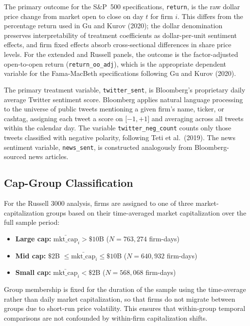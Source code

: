 The primary outcome for the S\&P~500 specifications, \texttt{return}, is
the raw dollar price change from market open to close on day \(t\) for
firm \(i\). This differs from the percentage return used in Gu and Kurov (2020); the dollar
denomination preserves interpretability of treatment coefficients as
dollar-per-unit sentiment effects, and firm fixed effects absorb
cross-sectional differences in share price levels. For the extended and
Russell panels, the outcome is the factor-adjusted open-to-open return
(\texttt{return\_oo\_adj}), which is the appropriate dependent variable
for the Fama-MacBeth specifications following Gu and Kurov (2020).

The primary treatment variable, \texttt{twitter\_sent}, is Bloomberg's
proprietary daily average Twitter sentiment score. Bloomberg applies
natural language processing to the universe of public tweets mentioning
a given firm's name, ticker, or cashtag, assigning each tweet a score on
\(\lbrack - 1, + 1\rbrack\) and averaging across all tweets within the
calendar day. The variable \texttt{twitter\_neg\_count} counts only
those tweets classified with negative polarity, following Teti et al.\ (2019). The news
sentiment variable, \texttt{news\_sent}, is constructed analogously from
Bloomberg-sourced news articles.

\subsection{Cap-Group Classification}\label{cap-group-classification}

For the Russell 3000 analysis, firms are assigned to one of three
market-capitalization groups based on their time-averaged market
capitalization over the full sample period:

\begin{itemize}
\item
  \textbf{Large cap:} \({\bar{\text{mkt\_cap}}}_{i} > \$ 10\)B
  (\(N = 763,274\) firm-days)
\item
  \textbf{Mid cap:} \(\$ 2\)B
  \(\leq {\bar{\text{mkt\_cap}}}_{i} \leq \$ 10\)B (\(N = 640,932\)
  firm-days)
\item
  \textbf{Small cap:} \({\bar{\text{mkt\_cap}}}_{i} < \$ 2\)B
  (\(N = 568,068\) firm-days)
\end{itemize}

Group membership is fixed for the duration of the sample using the
time-average rather than daily market capitalization, so that firms do
not migrate between groups due to short-run price volatility. This
ensures that within-group temporal comparisons are not confounded by
within-firm capitalization shifts.

